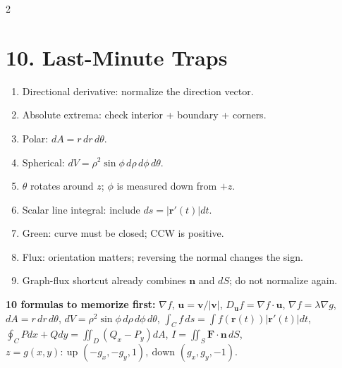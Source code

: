 \documentclass[10pt,a4paper]{article}
\begin{document}
\begin{multicols}{2}
\section*{10. Last-Minute Traps}
\begin{enumerate}
\item Directional derivative: normalize the direction vector.
\item Absolute extrema: check interior + boundary + corners.
\item Polar: $dA=r\,dr\,d\theta$.
\item Spherical: $dV=\rho^2\sin\phi\,d\rho\,d\phi\,d\theta$.
\item $\theta$ rotates around $z$; $\phi$ is measured down from $+z$.
\item Scalar line integral: include $ds=|\mathbf r'(t)|dt$.
\item Green: curve must be closed; CCW is positive.
\item Flux: orientation matters; reversing the normal changes the sign.
\item Graph-flux shortcut already combines $\mathbf n$ and $dS$; do not normalize again.
\end{enumerate}

\end{multicols}

\begin{rulebox}
\textbf{10 formulas to memorize first:}\quad
$\nabla f$, \quad
$\mathbf u=\mathbf v/|\mathbf v|$, \quad
$D_{\mathbf u}f=\nabla f\cdot\mathbf u$, \quad
$\nabla f=\lambda\nabla g$, \quad
$dA=r\,dr\,d\theta$, \quad
$dV=\rho^2\sin\phi\,d\rho\,d\phi\,d\theta$, \quad
$\int_C f\,ds=\int f(\mathbf r(t))|\mathbf r'(t)|dt$, \quad
$\oint_C Pdx+Qdy=\iint_D(Q_x-P_y)dA$, \quad
$I=\iint_S\mathbf F\cdot\mathbf n\,dS$, \quad
$z=g(x,y):\ \text{up }(-g_x,-g_y,1),\ \text{down }(g_x,g_y,-1)$.
\end{rulebox}
\end{document}
